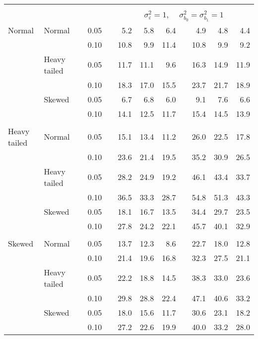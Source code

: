 \begin{table}[ht]
\begin{scriptsize}
\begin{center}
\begin{tabular}{ll p{.1cm} c p{.1cm} rrr p{.1cm} rrr}
&&&&&&&&&&&\\
& && && \multicolumn{7}{c}{$\sigma_{\varepsilon}^2 = 1$, \ \ $\sigma_{b_0}^2 = \sigma_{b_1}^2 = 1$} \\ \cline{6-12}
\rowcolor{gray!20}Normal       & Normal       && 0.05 &&   5.2 & 5.8 & 6.4 &   & 4.9 & 4.8 & 4.4 \\ 
\rowcolor{gray!20}             &              && 0.10 &&   10.8 & 9.9 & 11.4 &   & 10.8 & 9.9 & 9.2 \\ 
\rowcolor{gray!20}             & Heavy tailed && 0.05 &&   11.7 & 11.1 & 9.6 &   & 16.3 & 14.9 & 11.9 \\ 
\rowcolor{gray!20}             &              && 0.10 &&   18.3 & 17.0 & 15.5 &   & 23.7 & 21.7 & 18.9 \\ 
\rowcolor{gray!20}             & Skewed       && 0.05 &&   6.7 & 6.8 & 6.0 &   & 9.1 & 7.6 & 6.6 \\ 
\rowcolor{gray!20}             &              && 0.10 &&   14.1 & 12.5 & 11.7 &   & 15.4 & 14.5 & 13.9 \\ 
&&&&&&&&&&&\\
Heavy tailed & Normal       && 0.05 &&   15.1 & 13.4 & 11.2 &   & 26.0 & 22.5 & 17.8 \\ 
             &              && 0.10 &&   23.6 & 21.4 & 19.5 &   & 35.2 & 30.9 & 26.5 \\ 
             & Heavy tailed && 0.05 &&   28.2 & 24.9 & 19.2 &   & 46.1 & 43.4 & 33.7 \\ 
             &              && 0.10 &&   36.5 & 33.3 & 28.7 &   & 54.8 & 51.3 & 43.3 \\ 
             & Skewed       && 0.05 &&   18.1 & 16.7 & 13.5 &   & 34.4 & 29.7 & 23.5 \\ 
             &              && 0.10 &&   27.8 & 24.2 & 22.1 &   & 45.7 & 40.1 & 32.9 \\ 
&&&&&&&&&&&\\
Skewed       & Normal       && 0.05 &&   13.7 & 12.3 & 8.6 &   & 22.7 & 18.0 & 12.8 \\ 
             &              && 0.10 &&   21.4 & 19.6 & 16.8 &   & 32.3 & 27.5 & 21.1 \\ 
             & Heavy tailed && 0.05 &&   22.2 & 18.8 & 14.5 &   & 38.3 & 33.0 & 23.6 \\ 
             &              && 0.10 &&   29.8 & 28.8 & 22.4 &   & 47.1 & 40.6 & 33.2 \\ 
             & Skewed       && 0.05 &&   18.0 & 15.6 & 11.7 &   & 30.6 & 23.1 & 18.2 \\ 
             &              && 0.10 &&   27.2 & 22.6 & 19.9 &   & 40.0 & 33.2 & 28.0 \\ 


\end{tabular}
\end{center}
\end{scriptsize}
\end{table}
